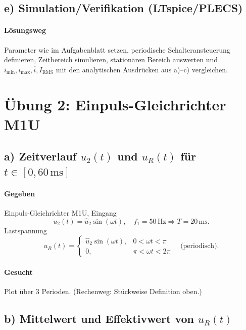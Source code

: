 
\subsection*{e) Simulation/Verifikation (LTspice/PLECS)}

\paragraph{Lösungsweg}
Parameter wie im Aufgabenblatt setzen, periodische Schalteransteuerung definieren,
Zeitbereich simulieren, stationären Bereich auswerten und $i_\mathrm{min},i_\mathrm{max},\overline{i},I_{\mathrm{RMS}}$
mit den analytischen Ausdrücken aus a)–c) vergleichen.



\section{Übung 2: Einpuls-Gleichrichter M1U }

\subsection*{a) Zeitverlauf $u_2(t)$ und $u_R(t)$ für $t\in[0,60\,\mathrm{ms}]$}

\paragraph{Gegeben}
Einpuls-Gleichrichter M1U, Eingang
\[
u_2(t)=\hat u_2\sin(\omega t),
\quad f_1=50\,\mathrm{Hz}\Rightarrow T=20\,\mathrm{ms}.
\]
Lastspannung
\[
u_R(t)=
\begin{cases}
\hat u_2\sin(\omega t), & 0<\omega t<\pi\\
0, & \pi<\omega t<2\pi
\end{cases}
\quad\text{(periodisch)}.
\]

\paragraph{Gesucht}
Plot über 3 Perioden. (Rechenweg: Stückweise Definition oben.)

\subsection*{b) Mittelwert und Effektivwert von $u_R(t)$}

